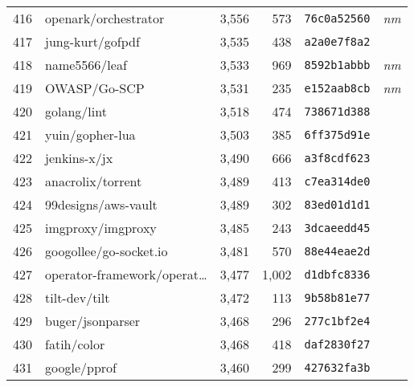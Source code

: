 {\begin{supertabular}{llrrll}
        416 &               openark/orchestrator &  3,556 &    573 &  \texttt{76c0a52560} &  \textit{nm} \\
        417 &                   jung-kurt/gofpdf &  3,535 &    438 &  \texttt{a2a0e7f8a2} &              \\
        418 &                      name5566/leaf &  3,533 &    969 &  \texttt{8592b1abbb} &  \textit{nm} \\
        419 &                       OWASP/Go-SCP &  3,531 &    235 &  \texttt{e152aab8cb} &  \textit{nm} \\
        420 &                        golang/lint &  3,518 &    474 &  \texttt{738671d388} &              \\
        421 &                    yuin/gopher-lua &  3,503 &    385 &  \texttt{6ff375d91e} &              \\
        422 &                       jenkins-x/jx &  3,490 &    666 &  \texttt{a3f8cdf623} &              \\
        423 &                  anacrolix/torrent &  3,489 &    413 &  \texttt{c7ea314de0} &              \\
        424 &                99designs/aws-vault &  3,489 &    302 &  \texttt{83ed01d1d1} &              \\
        425 &                  imgproxy/imgproxy &  3,485 &    243 &  \texttt{3dcaeedd45} &              \\
        426 &             googollee/go-socket.io &  3,481 &    570 &  \texttt{88e44eae2d} &              \\
        427 &    operator-framework/operat\ldots &  3,477 &  1,002 &  \texttt{d1dbfc8336} &              \\
        428 &                      tilt-dev/tilt &  3,472 &    113 &  \texttt{9b58b81e77} &              \\
        429 &                   buger/jsonparser &  3,468 &    296 &  \texttt{277c1bf2e4} &              \\
        430 &                        fatih/color &  3,468 &    418 &  \texttt{daf2830f27} &              \\
        431 &                       google/pprof &  3,460 &    299 &  \texttt{427632fa3b} &              \\

\end{supertabular}}
